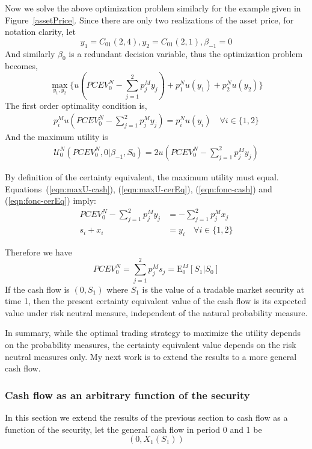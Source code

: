 \documentclass{article}[12pt letter]
\newcommand{\E}{\mathrm{E}}
\begin{document}
Now we solve the above optimization problem similarly for the example given in Figure~\ref{assetPrice}. Since there are only two realizations of the asset price, for notation clarity, let
\[ y_1 = C_{01}(2,4), y_2 = C_{01}(2,1), \beta_{-1} = 0 \]
And similarly $\beta_0$ is a redundant decision variable, thus the optimization problem becomes,
\[ \max_{y_1,y_2} \{ u(PCEV_0^N-\sum_{j=1}^2p_j^M y_j) + p_1^Nu(y_1) + p_2^Nu(y_2)\}\]
The first order optimality condition is,
\begin{align} \label{eqn:fonc-cerEq}
p_i^M u(PCEV_0^N - \sum_{j=1}^2 p_j^M y_j) = p_i^N u(y_i) \quad \forall i\in \{1,2\} 
\end{align}
And the maximum utility is
\begin{align} \label{eqn:maxU-cerEq}
\mathcal{U}^N_0 (PCEV_0^N, 0|\beta_{-1},S_0)  =2u(PCEV_0^N-\sum_{j=1}^2 p_j^My_j)
\end{align}

By definition of the certainty equivalent, the maximum utility must equal. Equations~(\ref{eqn:maxU-cash}), (\ref{eqn:maxU-cerEq}), (\ref{eqn:fonc-cash}) and (\ref{eqn:fonc-cerEq}) imply:
\begin{align}
PCEV_0^N - \sum_{j=1}^2 p_j^My_j &= -\sum_{j=1}^2 p_j^Mx_j \\
s_i + x_i &= y_i \quad \forall i \in \{1,2\} \label{eqn:s_i}
\end{align}

Therefore we have
\[PCEV_0^N = \sum_{j=1}^2 p_j^M s_j  = \E_0^M[S_1|S_0]\]
{\lemma If the cash flow is $(0,S_1)$ where $S_1$ is the value of a tradable market security at time 1, then the present certainty equivalent value of the cash flow is its expected value under risk neutral measure, independent of the natural probability measure.}


In summary, while the optimal trading strategy to maximize the utility depends on the probability measures, the certainty equivalent value depends on the risk neutral measures only. My next work is to extend the results to a more general cash flow.

\subsubsection{Cash flow as an arbitrary function of the security}
In this section we extend the results of the previous section to cash flow as a function of the security, let the general cash flow in period 0 and 1 be
\[(0, X_1(S_1))\]
\end{document}
